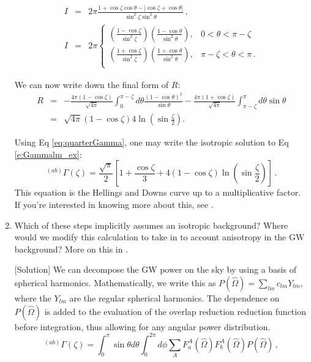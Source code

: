 \documentclass[article, onecolumn, ,nofootinbib,nopreprintnumbers]{revtex4}
\newcommand{\bea}{\begin{eqnarray}}
\newcommand{\eea}{\end{eqnarray}}
\begin{document}
\begin{enumerate}
\begin{eqnarray}
I&=&2\pi\frac{1+\cos\zeta\cos\theta-|\cos\zeta+\cos\theta|}{\sin^2\zeta\sin^2\theta}\label{eq:An1}\, ,\\
I&=&2\pi
 \left\{
\begin{array}{lc}
\left(\frac{1-\cos\zeta}{\sin^2\zeta}\right)\left(\frac{1-\cos\theta}{\sin^2\theta}\right), &		 	0<\theta<\pi-\zeta 	\\
\left(\frac{1+\cos\zeta}{\sin^2\zeta}\right)\left(\frac{1+\cos\theta}{\sin^2\theta}\right), &	 \pi-\zeta<\theta<\pi \label{eq:R00pm}\, .\\
\end{array}
\right.
\end{eqnarray}

We can now write down the final form of $R$:
\bea
R&=&-\frac{4\pi(1-\cos\zeta)}{\sqrt{4\pi}}\!\int_0^{\pi-\zeta}\!\!\! d\theta  \frac{(1-\cos\theta)^2}{\sin\theta}-\frac{4\pi(1+\cos\zeta)}{\sqrt{4\pi}}\!\int_{\pi-\zeta}^\pi\!\!\! d\theta\sin\theta\\
&=&\sqrt{4\pi}(1-\cos\zeta)4\ln\left(\sin\frac{\zeta}{2}\right).
\eea

 Using Eq \eqref{eq:quarterGamma}, one may write the isotropic solution to Eq \eqref{e:Gammalm_ex}:
\begin{equation}
{}^{(ab)}\Gamma(\zeta)=\frac{\sqrt{\pi}}{2}\left[1+\frac{\cos\zeta}{3}+4(1-\cos\zeta)\ln\left(\sin\frac{\zeta}{2}\right)\right]\, .
\end{equation}
This equation is the Hellings and Downs curve up to a multiplicative factor. If you're interested in knowing more about this, see \cite{MingarelliSidery:2014}.

\item Which of these steps implicitly assumes an isotropic background? Where would we modify this calculation to take in to account anisotropy in the GW background? More on this in \cite{MingarelliEtAl:2013}.


[Solution] We can decompose the GW power on the sky by using a basis of spherical harmonics. Mathematically, we write this as $P(\hat\Omega)=\sum_{lm}c_{lm}Y_{lm}$, where the $Y_{lm}$ are the regular spherical harmonics. The dependence on $P(\hat\Omega)$ is added to the evaluation of the overlap reduction reduction function before integration, thus allowing for any angular power distribution.
\begin{equation}
^{(ab)}\Gamma(\zeta)=\int_0^\pi  \sin\theta d\theta \int_0^{2\pi} d\phi  \sum_A F^A_a(\hat \Omega) F^A_b(\hat \Omega) P(\hat\Omega)\, ,
\end{equation}
\end{enumerate}


\end{document}
